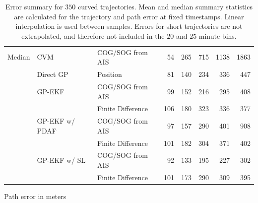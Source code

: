 \begin{table}
\begin{subtable}{\textwidth}
{\begin{tabular}{lllrrrrr}
                \hline
                Median  & CVM            & COG/SOG from AIS  & 54  & 265 & 715  & 1138 & 1863 \\
                        & Direct GP      & Position          & 81  & 140 & 234  & 336  & 447  \\
                        & GP-EKF         & COG/SOG from AIS  & 99  & 152 & 216  & 295  & 408  \\
                        &                & Finite Difference & 106 & 180 & 323  & 336  & 377  \\
                        & GP-EKF w/ PDAF & COG/SOG from AIS  & 97  & 157 & 290  & 401  & 908  \\
                        &                & Finite Difference & 101 & 182 & 304  & 371  & 402  \\
                        & GP-EKF w/ SL   & COG/SOG from AIS  & 92  & 133 & 195  & 227  & 302  \\
                        &                & Finite Difference & 101 & 173 & 290  & 309  & 395  \\
                \bottomrule
            \end{tabular}
        }
        \caption{Path error in meters}
        \label{table:stats_curved_path_err}
    \end{subtable}
    \caption{Error summary for $350$ curved trajectories. Mean and median summary statistics are calculated for the trajectory and path error at fixed timestamps. Linear interpolation is used between samples. Errors for short trajectories are not extrapolated, and therefore not included in the $20$ and $25$ minute bins.}
    \label{table:stats_curved_error}
\end{table}


